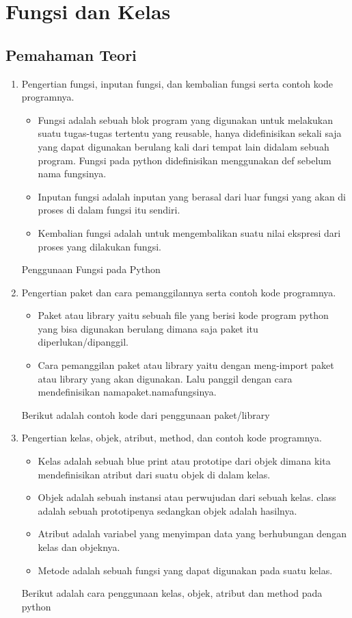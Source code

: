 \chapter{Fungsi dan Kelas}
\section{Pemahaman Teori}
\begin{enumerate}
\item Pengertian fungsi, inputan fungsi, dan kembalian fungsi serta contoh kode programnya.
\begin{itemize}
    \item Fungsi adalah sebuah blok program yang digunakan untuk melakukan suatu tugas-tugas tertentu yang reusable, hanya didefinisikan sekali saja yang dapat digunakan berulang kali dari tempat lain didalam sebuah program. Fungsi pada python didefinisikan menggunakan def sebelum nama fungsinya.
    \item Inputan fungsi adalah inputan yang berasal dari luar fungsi yang akan di proses di dalam fungsi itu sendiri.
    \item Kembalian fungsi adalah untuk mengembalikan suatu nilai ekspresi dari proses yang dilakukan fungsi.
\end{itemize}
    Penggunaan Fungsi pada Python
    
    
\item{Pengertian paket dan cara pemanggilannya serta contoh kode programnya.}
	\begin{itemize}
	    \item Paket atau library yaitu sebuah file yang berisi kode program python yang bisa digunakan berulang dimana saja paket itu diperlukan/dipanggil.
	    \item Cara pemanggilan paket atau library yaitu dengan meng-import paket atau library yang akan digunakan. Lalu panggil dengan cara mendefinisikan namapaket.namafungsinya.
	\end{itemize} 
	\newpage
	Berikut adalah contoh kode dari penggunaan paket/library
	
	    
\item{Pengertian kelas, objek, atribut, method, dan contoh kode programnya.}
\begin{itemize}
    \item Kelas adalah sebuah blue print atau prototipe dari objek dimana kita mendefinisikan atribut dari suatu objek di dalam kelas.
	\item Objek adalah sebuah instansi atau perwujudan dari sebuah kelas. class adalah sebuah prototipenya sedangkan objek adalah hasilnya.
	\item Atribut adalah variabel yang menyimpan data yang berhubungan dengan kelas dan objeknya.
    \item Metode adalah sebuah fungsi yang dapat digunakan pada suatu kelas.
\end{itemize}
    Berikut adalah cara penggunaan kelas, objek, atribut dan method pada python
	


\end{enumerate}

